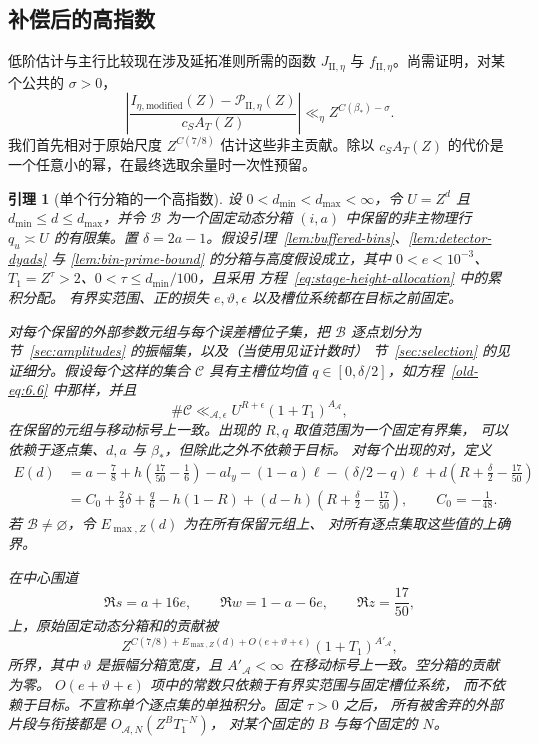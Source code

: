\documentclass[11pt,a4paper]{article}
\numberwithin{equation}{section}
\numberwithin{figure}{section}
\newtheorem{lemma}[theorem]{引理}
\theoremstyle{definition}
\theoremstyle{remark}
\begin{document}
\subsection{补偿后的高指数}

低阶估计与主行比较现在涉及延拓准则所需的函数
$J_{\mathrm{II},\eta}$ 与 $f_{\mathrm{II},\eta}$。尚需证明，对某个公共的
$\sigma>0$，
\[
 \left|\frac{I_{\eta,\mathrm{modified}}(Z)
                -\mathscr P_{\mathrm{II},\eta}(Z)}{c_S A_T(Z)}\right|
 \ll_\eta Z^{C(\beta_*)-\sigma}.
\]
我们首先相对于原始尺度 $Z^{C(7/8)}$ 估计这些非主贡献。除以
$c_S A_T(Z)$ 的代价是一个任意小的幂，在最终选取余量时一次性预留。


\begin{lemma}[单个行分箱的一个高指数]\label{lem:high-bin}
设 \(0<d_{\min}<d_{\max}<\infty\)，令 \(U=Z^d\) 且
\(d_{\min}\le d\le d_{\max}\)，并令
\(\mathcal B\) 为一个固定动态分箱 \((i,a)\) 中保留的非主物理行
\(q_u\asymp U\) 的有限集。置
\(\delta=2a-1\)。假设引理~\ref{lem:buffered-bins}、\ref{lem:detector-dyads}
与 \ref{lem:bin-prime-bound} 的分箱与高度假设成立，其中
\(0<e<10^{-3}\)、\(T_1=Z^\tau>2\)、\(0<\tau\le d_{\min}/100\)，且采用
方程~\eqref{eq:stage-height-allocation} 中的累积分配。
有界实范围、正的损失 \(e,\vartheta,\epsilon\) 以及槽位系统都在目标之前固定。

对每个保留的外部参数元组与每个误差槽位子集，把 \(\mathcal B\)
逐点划分为节~\ref{sec:amplitudes} 的振幅集，以及（当使用见证计数时）
节~\ref{sec:selection} 的见证细分。假设每个这样的集合 \(\mathcal C\)
具有主槽位均值 \(q\in[0,\delta/2]\)，如方程~\eqref{old-eq:6.6} 中那样，并且
\[
 \#\mathcal C\ll_{\mathcal A,\epsilon}
 U^{R+\epsilon}(1+T_1)^{A_{\mathcal A}},
\]
在保留的元组与移动标号上一致。出现的 \(R,q\) 取值范围为一个固定有界集，
可以依赖于逐点集、\(d,a\) 与 \(\beta_*\)，但除此之外不依赖于目标。
对每个出现的对，定义
\begin{equation}\label{eq:common-high-exponent}
 \begin{split}
 E(d)
 &=a-\frac78+h\left(\frac{17}{50}-\frac16\right)
       -a l_y-(1-a)\ell-(\delta/2-q)\ell
       +d\left(R+\frac\delta2-\frac{17}{50}\right)\\
 &=C_0+\frac23\delta+\frac q6-h(1-R)
       +(d-h)\left(R+\frac\delta2-\frac{17}{50}\right),
       \qquad C_0=-\frac1{48}.
 \end{split}
\end{equation}
若 \(\mathcal B\ne\varnothing\)，令 \(E_{\max,Z}(d)\) 为在所有保留元组上、
对所有逐点集取这些值的上确界。

在中心围道
\[
 \Re s=a+16e,\qquad \Re w=1-a-6e,\qquad \Re z=\frac{17}{50},
\]
上，原始固定动态分箱和的贡献被
\[
 Z^{C(7/8)+E_{\max,Z}(d)+O(e+\vartheta+\epsilon)}
 (1+T_1)^{A'_{\mathcal A}},
\]
所界，其中 \(\vartheta\) 是振幅分箱宽度，且
\(A'_{\mathcal A}<\infty\) 在移动标号上一致。空分箱的贡献为零。
\(O(e+\vartheta+\epsilon)\) 项中的常数只依赖于有界实范围与固定槽位系统，
而不依赖于目标。不宣称单个逐点集的单独积分。固定 \(\tau>0\) 之后，
所有被舍弃的外部片段与衔接都是 \(O_{\mathcal A,N}(Z^B T_1^{-N})\)，
对某个固定的 \(B\) 与每个固定的 \(N\)。
\end{lemma}
\end{document}
